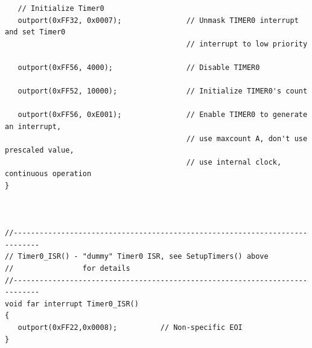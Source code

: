 \begin{verbatim}
   // Initialize Timer0
   outport(0xFF32, 0x0007);               // Unmask TIMER0 interrupt and set Timer0
                                          // interrupt to low priority

   outport(0xFF56, 4000);                 // Disable TIMER0

   outport(0xFF52, 10000);                // Initialize TIMER0's count

   outport(0xFF56, 0xE001);               // Enable TIMER0 to generate an interrupt,
                                          // use maxcount A, don't use prescaled value,
                                          // use internal clock, continuous operation
}



//----------------------------------------------------------------------------
// Timer0_ISR() - "dummy" Timer0 ISR, see SetupTimers() above
//                for details
//----------------------------------------------------------------------------
void far interrupt Timer0_ISR()
{
   outport(0xFF22,0x0008);          // Non-specific EOI
}
\end{verbatim}



%

